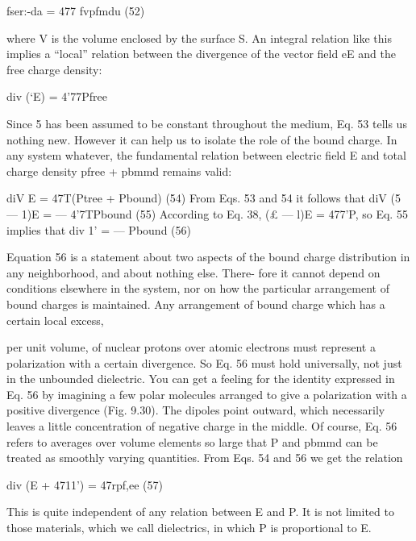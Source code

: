 {{{\begin{equation}
\end{equation}
fser:-da = 477 fvpfmdu (52)

where V is the volume enclosed by the surface S. An integral relation
like this implies a ``local'' relation between the divergence of
the vector field eE and the free charge density:

\begin{equation}
\end{equation}
div (‘E) = 4'77Pfree 

Since 5 has been assumed to be constant throughout the medium,
Eq. 53 tells us nothing new. However it can help us to isolate the
role of the bound charge. In any system whatever, the fundamental
relation between electric field E and total charge density pfree + pbmmd
remains valid:

\begin{equation}
\end{equation}
diV E = 47T(Ptree + Pbound) (54)
From Eqs. 53 and 54 it follows that
diV (5  ---  1)E =  --- 4'7TPbound (55)
According to Eq. 38, (£  ---  l)E = 477'P, so Eq. 55 implies that
div 1' =  --- Pbound (56)

Equation 56 is a statement about two aspects of the bound charge
distribution in any neighborhood, and about nothing else. There-
fore it cannot depend on conditions elsewhere in the system, nor
on how the particular arrangement of bound charges is maintained.
Any arrangement of bound charge which has a certain local excess,

per unit volume, of nuclear protons over atomic electrons must
represent a polarization with a certain divergence. So Eq. 56 must
hold universally, not just in the unbounded dielectric. You can get
a feeling for the identity expressed in Eq. 56 by imagining a few polar
molecules arranged to give a polarization with a positive divergence
(Fig. 9.30). The dipoles point outward, which necessarily leaves a
little concentration of negative charge in the middle. Of course,
Eq. 56 refers to averages over volume elements so large that P and
pbmmd can be treated as smoothly varying quantities.
From Eqs. 54 and 56 we get the relation

\begin{equation}
\end{equation}
div (E + 4711') = 47rpf,ee (57)

This is quite independent of any relation between E and P. It is not
limited to those materials, which we call dielectrics, in which P is
proportional to E.

}}}
